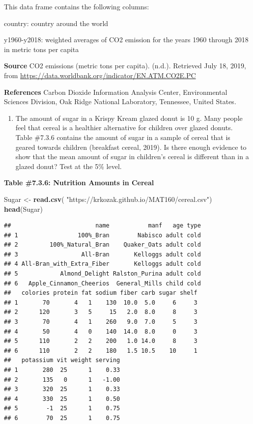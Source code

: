 \documentclass[
]{book}
\newenvironment{Shaded}{\begin{snugshade}}{\end{snugshade}}
\newcommand{\KeywordTok}[1]{\textcolor[rgb]{0.13,0.29,0.53}{\textbf{#1}}}
\newcommand{\NormalTok}[1]{#1}
\newcommand{\StringTok}[1]{\textcolor[rgb]{0.31,0.60,0.02}{#1}}
\providecommand{\tightlist}{%
  \setlength{\itemsep}{0pt}\setlength{\parskip}{0pt}}
\begin{document}
This data frame contains the following columns:

country: country around the world

y1960-y2018: weighted averages of CO2 emission for the years 1960 through 2018 in metric tons per capita

\textbf{Source}
CO2 emissions (metric tons per capita). (n.d.). Retrieved July 18, 2019, from \url{https://data.worldbank.org/indicator/EN.ATM.CO2E.PC}

\textbf{References}
Carbon Dioxide Information Analysis Center, Environmental Sciences Division, Oak Ridge National Laboratory, Tennessee, United States.

\begin{enumerate}
\def\labelenumi{\arabic{enumi}.}
\setcounter{enumi}{1}
\tightlist
\item
  The amount of sugar in a Krispy Kream glazed donut is 10 g. Many people feel that cereal is a healthier alternative for children over glazed donuts. Table \#7.3.6 contains the amount of sugar in a sample of cereal that is geared towards children (breakfast cereal, 2019). Is there enough evidence to show that the mean amount of sugar in children's cereal is different than in a glazed donut? Test at the 5\% level.
\end{enumerate}

\textbf{Table \#7.3.6: Nutrition Amounts in Cereal}

\begin{Shaded}
\begin{Highlighting}[]
\NormalTok{Sugar <-}\StringTok{ }\KeywordTok{read.csv}\NormalTok{(}
  \StringTok{"https://krkozak.github.io/MAT160/cereal.csv"}\NormalTok{)}
\KeywordTok{head}\NormalTok{(Sugar)}
\end{Highlighting}
\end{Shaded}

\begin{verbatim}
##                        name           manf   age type
## 1                 100%_Bran        Nabisco adult cold
## 2         100%_Natural_Bran    Quaker_Oats adult cold
## 3                  All-Bran       Kelloggs adult cold
## 4 All-Bran_with_Extra_Fiber       Kelloggs adult cold
## 5            Almond_Delight Ralston_Purina adult cold
## 6   Apple_Cinnamon_Cheerios  General_Mills child cold
##   colories protein fat sodium fiber carb sugar shelf
## 1       70       4   1    130  10.0  5.0     6     3
## 2      120       3   5     15   2.0  8.0     8     3
## 3       70       4   1    260   9.0  7.0     5     3
## 4       50       4   0    140  14.0  8.0     0     3
## 5      110       2   2    200   1.0 14.0     8     3
## 6      110       2   2    180   1.5 10.5    10     1
##   potassium vit weight serving
## 1       280  25      1    0.33
## 2       135   0      1   -1.00
## 3       320  25      1    0.33
## 4       330  25      1    0.50
## 5        -1  25      1    0.75
## 6        70  25      1    0.75
\end{verbatim}
\end{document}
